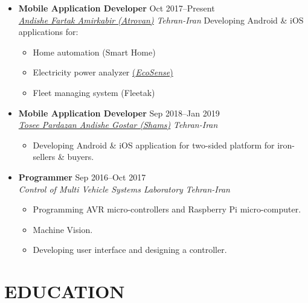 \documentclass[10pt,a4paper,sans]{moderncv} %
\newcommand*{\authorimg}[1]{%
	\raisebox{-.3\baselineskip}{%
		\texttt{[image: \#1]}%
	}%
}
\begin{document}
\begin{itemize}
	
	\item \textbf{Mobile Application Developer} \hfill Oct 2017--Present \\
	\href{http://atrovan.com}{\authorimg{pictures/atrovan.png} \emph{Andishe Fartak Amirkabir (Atrovan)}} \hfill \emph{Tehran-Iran}
	\vspace{1mm}
	\linebreak
	Developing Android \& iOS applications for:
	\begin{itemize}
		\item Home automation (Smart Home)
		\item Electricity power analyzer \href{http://atrovan.com/EcoSense}{(\emph{EcoSense})}
		\item Fleet managing system (Fleetak)
	\end{itemize}

	\item \textbf{Mobile Application Developer} \hfill Sep 2018--Jan 2019 \\
	\href{http://shamstech.ir}{\authorimg{pictures/shams.png} \emph{Tosee Pardazan Andishe Gostar (Shams)}} \hfill \emph{Tehran-Iran}
	
	\begin{itemize}
		\item Developing Android \& iOS application for two-sided platform for iron-sellers \& buyers.
	\end{itemize}
	
	\item \textbf{Programmer} \hfill Sep 2016--Oct 2017 \\
	\authorimg{pictures/aut.png} \emph{Control of Multi Vehicle Systems Laboratory} \hfill \emph{Tehran-Iran}
	
	\begin{itemize}
		\item Programming AVR micro-controllers and Raspberry Pi micro-computer. 
		\item Machine Vision. 
		\item Developing user interface and designing a controller.
	\end{itemize}
	
\end{itemize}

\section{EDUCATION}
\end{document}
